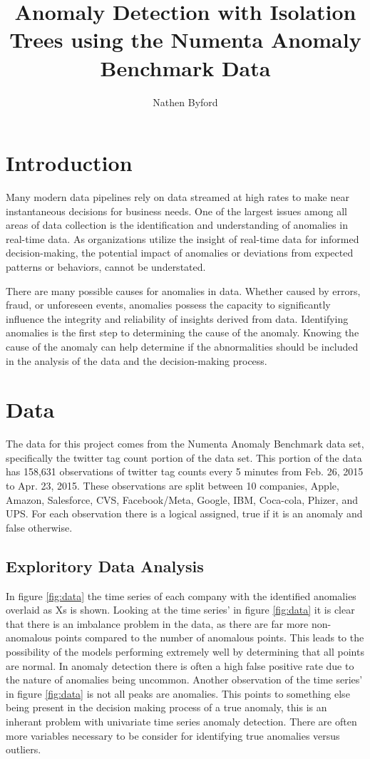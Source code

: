 \documentclass{article}
\title{Anomaly Detection with Isolation Trees using the Numenta Anomaly Benchmark Data}
\author{Nathen Byford}
\date{}
\begin{document}
\maketitle

\tableofcontents

\newpage 

\section{Introduction}
Many modern data pipelines rely on data streamed at high rates to make near instantaneous decisions for business needs. One of the largest issues among all areas of data collection is the identification and understanding of anomalies in real-time data. As organizations utilize the insight of real-time data for informed decision-making, the potential impact of anomalies or deviations from expected patterns or behaviors, cannot be understated. 

There are many possible causes for anomalies in data. Whether caused by errors, fraud, or unforeseen events, anomalies possess the capacity to significantly influence the integrity and reliability of insights derived from data. Identifying anomalies is the first step to determining the cause of the anomaly. Knowing the cause of the anomaly can help determine if the abnormalities should be included in the analysis of the data and the decision-making process.

\section{Data}
The data for this project comes from the Numenta Anomaly Benchmark data set, specifically the twitter tag count portion of the data set. This portion of the data has 158,631 observations of twitter tag counts every 5 minutes from Feb. 26, 2015 to Apr. 23, 2015. These observations are split between 10 companies, Apple, Amazon, Salesforce, CVS, Facebook/Meta, Google, IBM, Coca-cola, Phizer, and UPS. For each observation there is a logical assigned, true if it is an anomaly and false otherwise.

\subsection{Exploritory Data Analysis}
In figure \ref{fig:data} the time series of each company with the identified anomalies overlaid as Xs is shown. Looking at the time series' in figure \ref{fig:data} it is clear that there is an imbalance problem in the data, as there are far more non-anomalous points compared to the number of anomalous points. This leads to the possibility of the models performing extremely well by determining that all points are normal. In anomaly detection there is often a high false positive rate due to the nature of anomalies being uncommon. Another observation of the time series' in figure \ref{fig:data} is not all peaks are anomalies. This points to something else being present in the decision making process of a true anomaly, this is an inherant problem with univariate time series anomaly detection. There are often more variables necessary to be consider for identifying true anomalies versus outliers.
\end{document}
